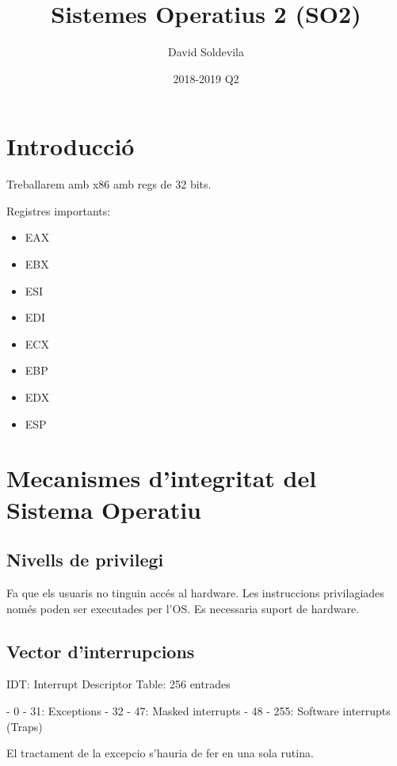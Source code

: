 \documentclass{article}
\title{Sistemes Operatius 2 (SO2)}
\date{2018-2019 Q2}
\author{David Soldevila}
\begin{document}
    \maketitle

    \pagebreak

    \tableofcontents

    \pagebreak

    \section{Introducció}

    Treballarem amb x86 amb regs de 32 bits.

    Registres importants:
    \begin{itemize}
        \item EAX
        \item EBX
        \item ESI
        \item EDI
        \item ECX
        \item EBP
        \item EDX
        \item ESP
    \end{itemize}

    \pagebreak

    \section{Mecanismes d'integritat del Sistema Operatiu}

    \subsection{Nivells de privilegi}

    Fa que els usuaris no tinguin accés al hardware. Les instruccions privilagiades només poden ser executades per l'OS. Es necessaria suport de hardware.

    \subsection{Vector d'interrupcions}

    IDT: Interrupt Descriptor Table: 256 entrades

    - 0 - 31: Exceptions
    - 32 - 47: Masked interrupts
    - 48 - 255: Software interrupts (Traps)

    El tractament de la excepcio s'hauria de fer en una sola rutina.
\end{document}
